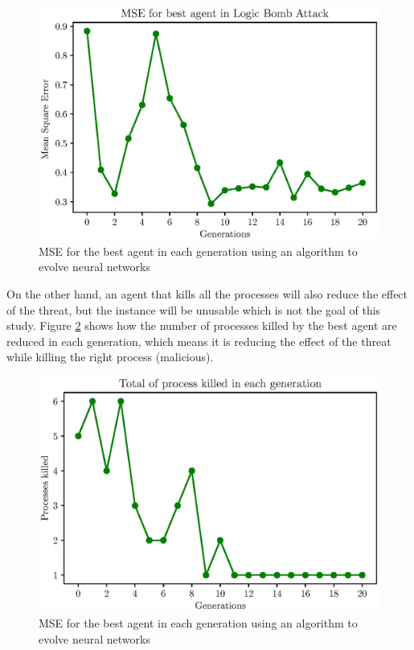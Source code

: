 \documentclass{iosart2c}
\begin{document}
\begin{figure}[h!]
\includegraphics[scale=0.5]{figs/results/reward_best_agent_final.eps}
\vspace{-0.5cm}
\caption{MSE for the best agent in each generation using an algorithm to evolve neural networks}
\label{fig:reward_top_agent}
\end{figure}


On the other hand, an agent that kills all the processes will also reduce the effect of the threat, but the instance will be unusable which is not the goal of this study. Figure \ref{fig:processes_killed_top_agent} shows how the number of processes killed by the best agent are reduced in each generation, which means it is reducing the effect of the threat while killing the right process (malicious).\\

\begin{figure}[h!]
\includegraphics[scale=0.5]{figs/results/number_process_final_top_agent.eps}
\vspace{-0.5cm}
\caption{MSE for the best agent in each generation using an algorithm to evolve neural networks}
\label{fig:processes_killed_top_agent}
\end{figure}
\end{document}
